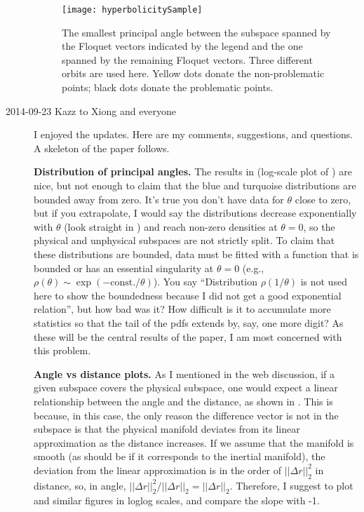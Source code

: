 \begin{description}
\begin{figure}[h]
  \centering
  \texttt{[image: hyperbolicitySample]}
  \caption{The smallest principal angle between the subspace
    spanned by the Floquet vectors indicated by the legend and the one spanned
    by the remaining Floquet vectors. Three different orbits are used here.
    Yellow dots donate the non-problematic points;  black dots donate the
    problematic points.
    }
  \label{fig:hyperbolicitySample}
\end{figure}

\item[2014-09-23 Kazz to Xiong and everyone]
I enjoyed the updates. Here are my comments, suggestions, and questions.
A skeleton of the paper follows.

\textbf{Distribution of principal angles.}
The results in 
(log-scale plot of ) are nice,
 but not enough to claim that the blue and turquoise distributions are bounded
 away from zero.
It's true you don't have data for $\theta$ close to zero,
 but if you extrapolate, I would say the distributions decrease exponentially
 with $\theta$ (look straight in )
 and reach non-zero densities at $\theta = 0$,
 so the physical and unphysical subspaces are not strictly split.
To claim that these distributions are bounded, data must be fitted with
 a function that is bounded or has an essential singularity at $\theta =0$
 (e.g., $\rho(\theta) \sim \exp(-\text{const.}/\theta)$).
You say ``Distribution $\rho(1/\theta)$ is not used here
to show the boundedness because I did not get a good exponential relation'',
 but how bad was it?
How difficult is it to accumulate more statistics
 so that the tail of the pdfs extends by, say, one more digit?
As these will be the central results of the paper,
 I am most concerned with this problem.

\textbf{Angle vs distance plots.}
As I mentioned in the web discussion,
 if a given subspace covers the physical subspace,
 one would expect a linear relationship between the angle and the distance,
 as shown in .
This is because, in this case,
 the only reason the difference vector is not in the subspace
 is that the physical manifold deviates from its linear approximation
 as the distance increases.
If we assume that the manifold is smooth
 (as should be if it corresponds to the inertial manifold),
 the deviation from the linear approximation is
 in the order of $||\Delta r||_2^2$ in distance,
 so, in angle, $||\Delta r||_2^2 / ||\Delta r||_2 = ||\Delta r||_2$.
Therefore, I suggest to plot 
 and similar figures in loglog scales, and compare the slope with -1.


\end{description}
